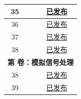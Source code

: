\begin{longtable}[c]{|c|m{12cm}|c|}
35	&	\nameref*{mod:ledpwm}	&	\hyperref[mod:ledpwm]{已发布}	\\\hline
36	&	\nameref*{mod:mcpwm}	&	\hyperref[mod:mcpwm]{已发布}	\\\hline
37	&	\nameref*{mod:rmt}	&	\hyperref[mod:rmt]{已发布}	\\\hline
38	&	\nameref*{mod:parlio}	&	\hyperref[mod:parlio]{已发布}	\\\hline
\multicolumn{3}{|c|}{\textbf{第 \uppercase\expandafter{\romannumeral6} 卷：模拟信号处理}}	\\\hline
38	&	\nameref*{mod:tmpsen}	&	\hyperref[mod:tmpsen]{已发布}	\\\hline
39	&	\nameref*{mod:adc}	&	\hyperref[mod:adc]{已发布}	\\\hline
\end{longtable}


